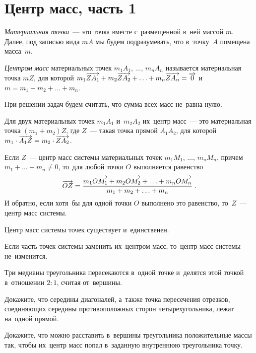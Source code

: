 

\section*{Центр масс, часть 1}


\begingroup\let\ov\overrightarrow

\emph{Материальная точка}~--- это точка вместе с~размещенной в~ней массой $m$.
Далее, под записью вида $mA$ мы будем подразумевать, что в~точку~$A$ помещена
масса~$m$.

\emph{Центром масс} материальных точек $m_1A_1$, $\ldots$, $m_n A_n$ называется
материальная точка $mZ$, для которой
\(
    m_1 \ov{Z A_1} + m_2 \ov{Z A_2}
    + \ldots +
    m_n \ov{Z A_n}
=
    \ov{0}
\)
и~$m = m_1 + m_2 + \ldots + m_n$.

При решении задач будем считать, что сумма всех масс не~равна нулю.

Для двух материальных точек $m_1 A_1$ и~$m_2 A_2$ их~центр масс~--- это
материальная точка $(m_1 + m_2) Z$, где $Z$~--- такая точка прямой $A_1 A_2$,
для которой $m_1 \cdot \ov{A_1 Z} = m_2 \cdot \ov{Z A_2}$.

Если $Z$~--- центр масс системы материальных точек
$m_1 M_1$, $\ldots$, $m_n M_n$, причем $m_1 + \ldots + m_n \neq 0$,
то~для любой точки $O$ выполняется равенство
\[
    \ov{OZ}
=
    \frac{
        m_1 \ov{O M_1} + m_2 \ov{O M_2} + \ldots + m_n \ov{O M_n}
    }{
        m_1 + m_2 + \ldots + m_n
    }
\;.\]
И обратно, если хотя~бы для одной точки $O$ выполнено это равенство, то~$Z$~---
центр масс системы.

Центр масс системы точек существует и~единственен.

Если часть точек системы заменить их~центром масс, то~центр масс системы
не~изменится.

Три медианы треугольника пересекаются в~одной точке и~делятся этой точкой
в~отношении $2 : 1$, считая от~вершины.

Докажите, что середины диагоналей, а~также точка пересечения отрезков,
соединяющих середины противоположных сторон четырехугольника, лежат на~одной
прямой.

Докажите, что можно расставить в~вершины треугольника положительные массы так,
чтобы их~центр масс попал в~заданную внутреннюю треугольника точку.

